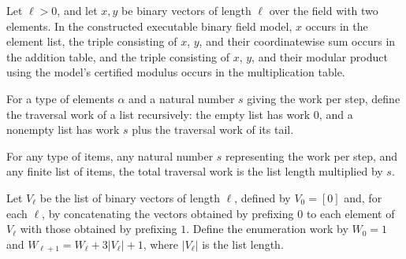 \begin{theorem}
\label{FABL.buildExecutableBinaryFieldModel_complete}
\leanok
{}
Let $\ell>0$, and let $x,y$ be binary vectors of length $\ell$ over the
field with two elements. In the constructed executable binary field model, $x$ occurs in
the element list, the triple consisting of $x$, $y$, and their coordinatewise sum occurs
in the addition table, and the triple consisting of $x$, $y$, and their modular product
using the model's certified modulus occurs in the multiplication table.
\end{theorem}

\begin{definition}
\label{FABL.binaryConstructorTraversalWork}
\leanok
For a type of elements $\alpha$ and a natural number $s$ giving the work per step,
define the traversal work of a list recursively: the empty list has work $0$, and a
nonempty list has work $s$ plus the traversal work of its tail.
\end{definition}

\begin{theorem}
\label{FABL.binaryConstructorTraversalWork_eq}
\leanok
{}
For any type of items, any natural number $s$ representing the work per step, and any
finite list of items, the total traversal work is the list length multiplied by $s$.
\end{theorem}

\begin{definition}
\label{FABL.binaryVectorEnumerationWork}
\leanok
{}
Let $V_\ell$ be the list of binary vectors of length $\ell$, defined by $V_0=[0]$ and,
for each $\ell$, by concatenating the vectors obtained by prefixing $0$ to each element
of $V_\ell$ with those obtained by prefixing $1$. Define the enumeration work by $W_0=1$
and $W_{\ell+1}=W_\ell+3|V_\ell|+1$, where $|V_\ell|$ is the list length.
\end{definition}

